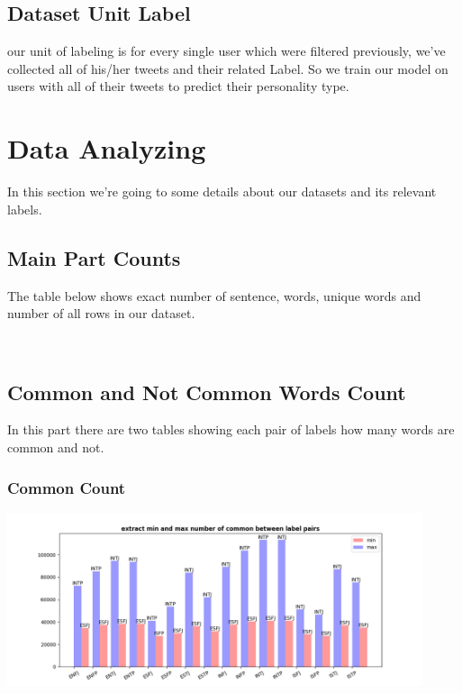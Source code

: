 \documentclass[10pt, a4paper]{article}
\begin{document}
\subsection{Dataset Unit Label}
our unit of labeling is for every single user which were filtered previously, we've collected all of his/her tweets and their related
Label. So we train our model on users with all of their tweets to predict their personality type.

\section{Data Analyzing}
In this section we're going to some details about our datasets and its relevant labels.

\subsection{Main Part Counts}
The table below shows exact number of sentence, words, unique words and number of all rows in our dataset.
\\
\begin{adjustbox}{center}
\end{adjustbox}
\\
\subsection{Common and Not Common Words Count}
In this part there are two tables showing each pair of labels how many words are common and not.

\subsubsection{Common Count}
\begin{adjustbox}{max width=\textwidth,totalheight=2in}
\end{adjustbox}
\begin{center}
    \includegraphics[width = \textwidth, height=2in]{../stats/common_count.png}
\end{center}
\end{document}
